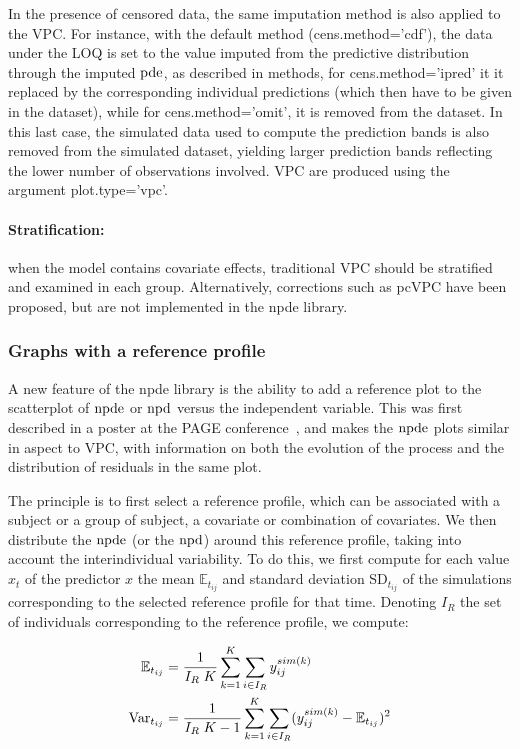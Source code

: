 In the presence of censored data, the same imputation method is also applied to the VPC. For instance, with the default method ({\sf cens.method='cdf'}), the data under the LOQ is set to the value imputed from the predictive distribution through the imputed ${\rm pde}$, as described in methods, for {\sf cens.method='ipred'} it it replaced by the corresponding individual predictions (which then have to be given in the dataset), while for {\sf cens.method='omit'}, it is removed from the dataset. In this last case, the simulated data used to compute the prediction bands is also removed from the simulated dataset, yielding larger prediction bands reflecting the lower number of observations involved. VPC are produced using the argument {\sf plot.type='vpc'}.

\paragraph{Stratification:} when the model contains covariate effects, traditional VPC should be stratified and examined in each group. Alternatively, corrections such as pcVPC have been proposed, but are not implemented in the {\sf npde} library. 

\subsubsection{Graphs with a reference profile}

\hskip 18pt A new feature of the {\sf npde} library is the ability to add a reference plot to the scatterplot of ${\rm npde}$ or ${\rm npd}$ versus the independent variable. This was first described in a poster at the PAGE conference~\cite{CometsPAGE13}, and makes the ${\rm npde}$ plots similar in aspect to VPC, with information on both the evolution of the process and the distribution of residuals in the same plot. 

The principle is to first select a reference profile, which can be associated with a subject or a group of subject, a covariate or combination of covariates. We then distribute the ${\rm npde}$ (or the ${\rm npd}$) around this reference profile, taking into account the interindividual variability. To do this, we first compute for each value $x_t$ of the predictor $x$ the mean $\mathbb{E}_{t_{ij}}$ and standard deviation SD$_{t_{ij}}$ of the simulations corresponding to the selected reference profile for that time. Denoting $I_R$ the set of individuals corresponding to the reference profile, we compute:

\begin{equation}
\begin{split}
\mathbb{E}_{t_{ij}} &= \frac{1}{I_R \; K} \sum_{k=1}^{K} \sum_{i \in I_R}  y_{ij}^{sim(k)} \\
{\rm Var}_{t_{ij}} &=  \frac{1}{I_R \; K -1}  \sum_{k=1}^{K} \sum_{i \in I_R}  (y_{ij}^{sim(k)} - \mathbb{E}_{t_{ij}})^2 \\
\end{split}
\end{equation}

